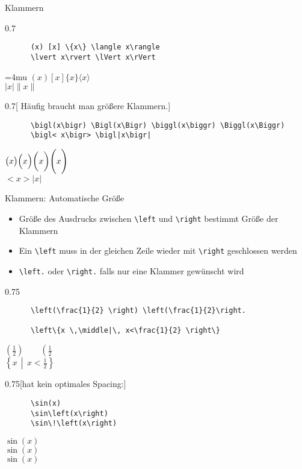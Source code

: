 \begin{frame}[fragile]{Klammern}
  \vspace{-1.5em}
  \begin{CodeExample}{0.7}
    \begin{lstlisting}
      (x) [x] \{x\} \langle x\rangle
      \lvert x\rvert \lVert x\rVert
    \end{lstlisting}
  \CodeResult
    \Umathcloseopenspacing\textstyle=4mu
    $(x) [x] \{x\} \langle x\rangle $\\
    $\lvert x\rvert \lVert x\rVert$
  \end{CodeExample}

  \begin{CodeExample}{0.7}[ Häufig braucht man größere Klammern.]
    \begin{lstlisting}
      \bigl(x\bigr) \Bigl(x\Bigr) \biggl(x\biggr) \Biggl(x\Biggr)
      \bigl< x\bigr> \bigl|x\bigr|
    \end{lstlisting}
  \CodeResult
    $\bigl(x\bigr) \Bigl(x\Bigr) \biggl(x\biggr) \Biggl(x\Biggr)$ \\
    $\bigl< x\bigr>\bigl|x\bigr|$
  \end{CodeExample}
\end{frame}

\begin{frame}[fragile]{Klammern: Automatische Größe}
  \begin{itemize}
    \item Größe des Ausdrucks zwischen \lstinline+\left+ und \lstinline+\right+ bestimmt Größe der Klammern
    \item Ein \lstinline+\left+ muss in der gleichen Zeile wieder mit \lstinline+\right+ geschlossen werden
    \item \lstinline+\left.+ oder \lstinline+\right.+ falls nur eine Klammer gewünscht wird
  \end{itemize}
  \begin{CodeExample}{0.75}
    \begin{lstlisting}
      \left(\frac{1}{2} \right) \left(\frac{1}{2}\right.

      \left\{x \,\middle|\, x<\frac{1}{2} \right\}
    \end{lstlisting}
  \CodeResult
$\left(\frac{1}{2}\right) \qquad \left(\frac{1}{2}\right.$ \\\smallskip
    $\left\{ x \, \middle| \, x < \frac{1}{2} \right\}$
  \end{CodeExample}

  \begin{CodeExample}{0.75}[hat kein optimales Spacing:]
    \begin{lstlisting}
      \sin(x)
      \sin\left(x\right)
      \sin\!\left(x\right)
    \end{lstlisting}
  \CodeResult
    $\sin(x)$ \\
    $\sin\left(x\right)$ \\
    $\sin\!\left(x\right)$
  \end{CodeExample}
\end{frame}

